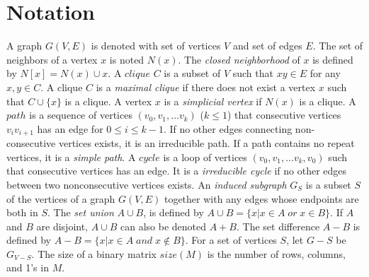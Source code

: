 \section{Notation}
A graph $G(V,E)$ is denoted with set of vertices $V$ and set of edges $E$. The set of neighbors of a vertex $x$ is noted $N(x)$. The \emph{closed neighborhood} of $x$ is defined by $N[x] = N(x) \cup x$. A $clique$ $C$ is a subset of $V$ such that $xy\in E$ for any $x,y \in C$. A clique $C$ is a \emph{maximal clique} if there does not exist a vertex $x$ such that $C\cup\{x\}$ is a clique. 
A vertex $x$ is a \emph{simplicial vertex} if $N(x)$ is a clique. A $path$ is a sequence of vertices $(v_0,v_1,...v_k)$ ($k \le 1$) that consecutive vertices $v_{i}v_{i+1}$ has an edge for $0\le i\le k-1$. If no other edges connecting non-consecutive vertices exists, it is an irreducible path. If a path contains no repeat vertices, it is a \emph{simple path}. A $cycle$ is a loop of vertices $(v_0,v_1,...v_k,v_0)$ such that consecutive vertices has an edge. It is a \emph{irreducible cycle} if no other edges between two nonconsecutive vertices exists.
An \emph{induced subgraph} $G_S$ is a subset $S$ of the vertices of a graph $G(V,E)$ together with any edges whose endpoints are both in $S$.
The \emph{set union} $A\cup B$, is defined by $A\cup B = \{x| x\in A\;or\;x \in B\}$. If $A$ and $B$ are disjoint, $A \cup B$ can also be denoted $A + B$.
The set difference $A-B$ is defined by $A-B = \{x| x \in A\;and\; x \notin B\}$. For a set of vertices $S$, let $G-S$ be $G_{V-S}$.
The size of a binary matrix $size(M)$ is the number of rows, columns, and 1's in $M$.

